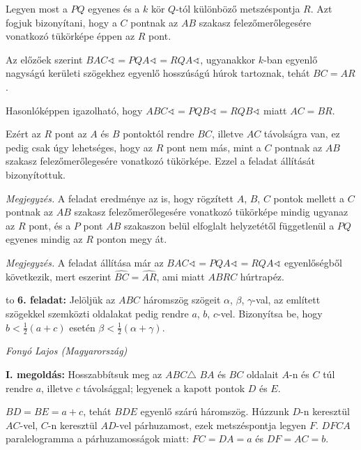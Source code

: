 \documentclass[a4paper,10pt]{article}
\newcommand{\ki}[2]{\hfill {\it #1 (#2)}\medskip}
\newcommand{\vonal}{\hbox to \hsize{\hskip2truecm\hrulefill\hskip2truecm}}
\begin{document}
Legyen most a $PQ$ egyenes és a $k$ kör $Q$-tól különböző metszéspontja $R$. Azt fogjuk bizonyítani, hogy a $C$ pontnak az $AB$ szakasz felezőmerőlegesére vonatkozó tükörképe éppen az $R$ pont.

Az előzőek szerint $BAC\sphericalangle=PQA\sphericalangle=RQA\sphericalangle$, ugyanakkor $k$-ban egyenlő nagyságú kerületi szögekhez egyenlő hosszúságú húrok tartoznak, tehát $BC=AR$.

Hasonlóképpen igazolható, hogy $ABC\sphericalangle=PQB\sphericalangle=RQB\sphericalangle$ miatt $AC=BR$.

Ezért az $R$ pont az $A$ és $B$ pontoktól rendre $BC$, illetve $AC$ távolságra van, ez pedig csak úgy lehetséges, hogy az $R$ pont nem más, mint a $C$ pontnak az $AB$ szakasz felezőmerőlegesére vonatkozó tükörképe. Ezzel a feladat állítását bizonyítottuk.

{\it Megjegyzés. } A feladat eredménye az is, hogy rögzített $A$, $B$, $C$ pontok mellett a $C$ pontnak az $AB$ szakasz felezőmerőlegesére vonatkozó tükörképe mindig ugyanaz az $R$ pont, és a $P$ pont $AB$ szakaszon belül elfoglalt helyzetétől függetlenül a $PQ$ egyenes mindig az $R$ ponton megy át.

{\it Megjegyzés. } A feladat állítása már az $BAC\sphericalangle=PQA\sphericalangle=RQA\sphericalangle$ egyenlőségből következik, mert eszerint $\widehat{BC}=\widehat{AR}$, ami miatt $ABRC$ húrtrapéz.

\medskip

\vonal
{\bf 6. feladat: } Jelöljük az $ABC$ háromszög szögeit $\alpha$, $\beta$, $\gamma$-val, az említett szögekkel szemközti oldalakat pedig rendre $a$, $b$, $c$-vel. Bizonyítsa be, hogy $b<\frac{1}{2}(a+c)$ esetén $\beta<\frac{1}{2}(\alpha+\gamma)$.

\ki{Fonyó Lajos}{Magyarország}\medskip

{\bf I. megoldás: } Hosszabbítsuk meg az $ABC\triangle$ $BA$ és $BC$ oldalait $A$-n és $C$ túl rendre $a$, illetve $c$ távolsággal; legyenek a kapott pontok $D$ és $E$.

$BD=BE=a+c$, tehát $BDE$ egyenlő szárú háromszög. Húzzunk $D$-n keresztül $AC$-vel, $C$-n keresztül $AD$-vel párhuzamost, ezek metszéspontja legyen $F$. $DFCA$ paralelogramma a párhuzamosságok miatt: $FC=DA=a$ és $DF=AC=b$.
\end{document}
